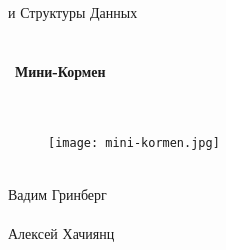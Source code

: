 \documentclass[a4paper,12pt]{article}
\begin{document}
\begin{titlepage}
  \begin{center}
  
    { и Структуры Данных}
  \\ \
  \\ \
  \\ \
  {\Huge \textbf{Мини-Кормен}}
    \\ \
    \\ \
    
    \begin{figure}[h]
    \begin{center}
        \begin{minipage}[h]{0.8\linewidth}
        \texttt{[image: mini-kormen.jpg]}
        \end{minipage}
    \end{center}
    \end{figure}
    \ \\
    
    {\Large Вадим Гринберг} \\ 
    \ \\ 
    {\Large Алексей Хачиянц} \\ 
   
\end{center}
\end{titlepage}

\tableofcontents

\newpage


\newpage

\newpage
\end{document}
